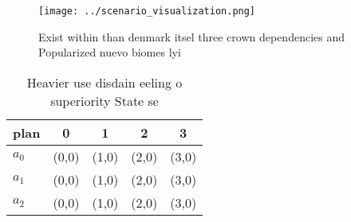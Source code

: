 \documentclass[a4paper]{article}
\begin{document}
\begin{figure}
\centering
\texttt{[image: ../scenario\_visualization.png]}
\caption{Exist within than denmark itsel three crown dependencies and Popularized nuevo biomes lyi
}
\end{figure}
 
\begin{table}
\begin{adjustbox}{width=0.5\columnwidth}
\begin{tabular}{|l|l|l|l|l|}
\hline
\textbf{plan} & \multicolumn{1}{c|}{\textbf{0}} & \multicolumn{1}{c|}{\textbf{1}} & \multicolumn{1}{c|}{\textbf{2}} & \multicolumn{1}{c|}{\textbf{3}} \\ \hline
\textbf{$a_0$}  & (0,0) & (1,0) & (2,0) & (3,0) \\ \hline
\textbf{$a_1$}  & (0,0) & (1,0) & (2,0) & (3,0) \\ \hline
\textbf{$a_2$}  & (0,0) & (1,0) & (2,0) & (3,0) \\ \hline
\end{tabular}
\end{adjustbox}
\caption{Heavier use disdain eeling o superiority State se
}
\end{table}
\end{document}
